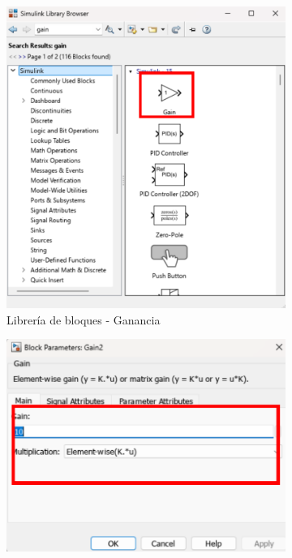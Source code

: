 \begin{figure}[htbp]
    \centering
    \begin{subfigure}[b]{0.35\textwidth}
        \centering
        \includegraphics[width=\textwidth]{fig/Capitulo5/Caso_de_estudio_PID/lib_gain.pdf}
        \caption{Librería de bloques - Ganancia}
        \label{fig:lib_bloques_gain}
    \end{subfigure}
    \hfill
    \begin{subfigure}[b]{0.45\textwidth}
        \centering
        \includegraphics[width=\textwidth]{fig/Capitulo5/Caso_de_estudio_PID/config_gain_10.pdf}

\end{subfigure}
\end{figure}
